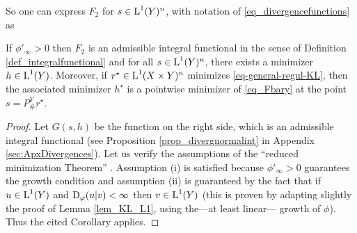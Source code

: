 %
So one can express $F_2$ for $s\in \text{\upshape L}^1(Y)^n$, with notation of \eqref{eq_divergencefunctions} as
%
\begin{proposition}
If $\phi'_\infty>0$ then $F_2$ is an admissible integral functional in the sense of Definition \ref{def_integralfunctional} and for all $s\in \text{\upshape L}^1(Y)^n$, there exists a minimizer $h\in \text{\upshape L}^1(Y)$. 
Moreover, if $r^\star \in \text{\upshape L}^1(X\times Y)^n$ minimizes \eqref{eq-general-regul-KL}, then the associated minimizer $h^\star$ is a pointwise minimizer of \eqref{eq_Fbary} at the point $s=P^Y_\# r^\star$.
\end{proposition}
\begin{proof}
Let $G(s,h)$ be the function on the right side, which is an admissible integral functional (see Proposition \ref{prop_divergnormalint} in Appendix \ref{sec:ApxDivergences}). Let us verify the assumptions of the ``reduced minimization Theorem'' \cite[Corollary 3B]{rockafellar1976integral}. Assumption (i) is satisfied because $\phi'_\infty>0$ guarantees the growth condition \cite[2R]{rockafellar1976integral} and assumption (ii) is guaranteed by the fact that if $u\in \text{\upshape L}^1(Y)$ and $\operatorname{D}_\varphi(u|v)<\infty$ then $v\in \text{\upshape L}^1(Y)$ (this is proven by adapting slightly the proof of Lemma \ref{lem_KL_L1}, using the---at least linear--- growth of $\phi$). Thus the cited Corollary applies.
\end{proof}
%
%
